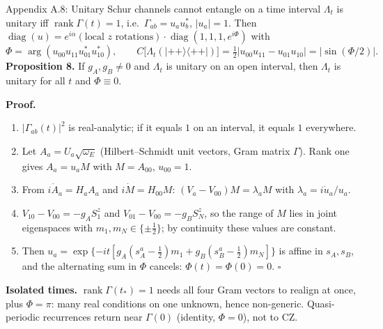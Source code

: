 \documentclass[aspectratio=169,11pt]{beamer}
\newcommand{\ket}[1]{\lvert #1\rangle}
\newcommand{\bra}[1]{\langle #1\rvert}
\newcommand{\diag}{\operatorname{diag}}
\newcommand{\rank}{\operatorname{rank}}
\begin{document}
\begin{frame}{Appendix A.8: Unitary Schur channels cannot entangle on a time interval}
\footnotesize
$\Lambda_t$ is unitary iff $\rank\Gamma(t)=1$, i.e.\ $\Gamma_{ab}=u_au_b^*$, $\lvert u_a\rvert=1$. Then $\diag(u)=e^{i\alpha}(\text{local }z\text{ rotations})\cdot\diag(1,1,1,e^{i\Phi})$ with
\[
\Phi=\arg(u_{00}u_{11}u_{01}^*u_{10}^*),\qquad C\bigl[\Lambda_t(\ket{++}\bra{++})\bigr]=\tfrac12\lvert u_{00}u_{11}-u_{01}u_{10}\rvert=\lvert\sin(\Phi/2)\rvert .
\]
\textbf{Proposition 8.} If $g_A,g_B\neq0$ and $\Lambda_t$ is unitary on an open interval, then $\Lambda_t$ is unitary for all $t$ and $\Phi\equiv0$.
\medskip

\textbf{Proof.}
\begin{enumerate}\setlength\itemsep{3pt}
\item $\lvert\Gamma_{ab}(t)\rvert^2$ is real-analytic; if it equals $1$ on an interval, it equals $1$ everywhere.
\item Let $A_a=U_a\sqrt{\omega_E}$ (Hilbert--Schmidt unit vectors, Gram matrix $\Gamma$). Rank one gives $A_a=u_aM$ with $M=A_{00}$, $u_{00}=1$.
\item From $i\dot A_a=H_aA_a$ and $i\dot M=H_{00}M$: $(V_a-V_{00})M=\lambda_aM$ with $\lambda_a=i\dot u_a/u_a$.
\item $V_{10}-V_{00}=-g_AS^z_1$ and $V_{01}-V_{00}=-g_BS^z_N$, so the range of $M$ lies in joint eigenspaces with $m_1,m_N\in\{\pm\tfrac12\}$; by continuity these values are constant.
\item Then $u_a=\exp\{-it[g_A(s^a_A-\tfrac12)m_1+g_B(s^a_B-\tfrac12)m_N]\}$ is affine in $s_A,s_B$, and the alternating sum in $\Phi$ cancels: $\Phi(t)=\Phi(0)=0$. $\square$
\end{enumerate}
\textbf{Isolated times.} $\rank\Gamma(t_*)=1$ needs all four Gram vectors to realign at once, plus $\Phi=\pi$: many real conditions on one unknown, hence non-generic. Quasi-periodic recurrences return near $\Gamma(0)$ (identity, $\Phi=0$), not to CZ.
\end{frame}
\end{document}
